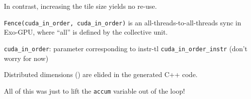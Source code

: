 In contrast, increasing the  tile size yields no re-use.


\newpage
{}



\texttt{Fence(cuda\_in\_order, cuda\_in\_order)} is an all-threads-to-all-threads sync in Exo-GPU, where ``all'' is defined by the collective unit.

\texttt{cuda\_in\_order}: parameter corresponding to instr-tl \texttt{cuda\_in\_order\_instr} (don't worry for now)

\newpage
{}



\newpage
{}



\newpage
{}



\newpage
{}



\newpage
{}



\newpage
{}



\newpage
{}



\newpage
{}


\newpage
{}

\begin{minipage}[t]{0.48\textwidth}\fixminipage
{}


\end{minipage}
\hfill
\begin{minipage}[t]{0.48\textwidth}\fixminipage
{}



\vspace{4mm}
Distributed dimensions () are elided in the generated C++ code.
\end{minipage}

All of this was just to lift the \texttt{accum} variable out of the loop!

